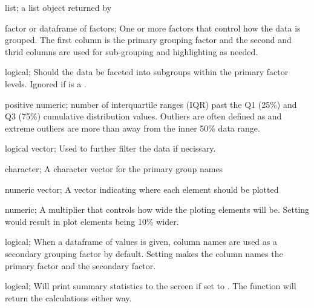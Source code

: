\documentclass[a4paper]{book}
\begin{document}
\begin{Arguments}
\begin{ldescription}
\item[\code{prepedData}] list; a list object returned by 

\item[\code{by}] factor or dataframe of factors; One or more factors that control how the data is grouped. The first column is the primary grouping factor and the second and thrid columns are used for sub-grouping and highlighting as needed.

\item[\code{subGroup}] logical; Should the data be faceted into subgroups within the primary factor levels. Ignored if  is a .

\item[\code{outliers}] positive numeric; number of interquartile ranges (IQR) past the Q1 (25\%) and Q3 (75\%) cumulative distribution values. Outliers are often defined as  and extreme outliers are more than  away from the inner 50\% data range.

\item[\code{filter}] logical vector; Used to further filter the data if necissary.

\item[\code{groupNames}] character; A character vector for the primary group names

\item[\code{plotLoc}] numeric vector; A vector indicating where each element should be plotted

\item[\code{width}] numeric; A multiplier that controls how wide the ploting elements will be. Setting  would result in plot elements being 10\% wider.

\item[\code{flipFacts}] logical; When a dataframe of values is given, column names are used as a secondary grouping factor by default. Setting  makes the column names the primary factor and  the secondary factor.

\item[\code{verbose}] logical; Will print summary statistics to the screen if set to . The function will return the calculations either way.
\end{ldescription}
\end{Arguments}
\end{document}
